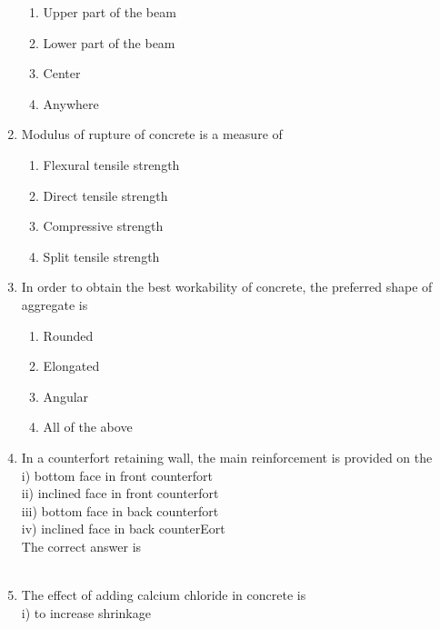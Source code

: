 \documentclass[11pt,a4paper]{article}
\begin{document}
\begin{enumerate}
\begin{enumerate}[label=\Alph*.]
\item{Upper part of the beam}
\item{Lower part of the beam}
\item{Center}
\item{Anywhere}
\end{enumerate}
\item{Modulus of rupture of concrete is a measure of}
\begin{enumerate}[label=\Alph*.]
\item{Flexural tensile strength}
\item{Direct tensile strength}
\item{Compressive strength}
\item{Split tensile strength}
\end{enumerate}
\item{In order to obtain the best workability of concrete, the preferred shape of aggregate is}
\begin{enumerate}[label=\Alph*.]
\item{Rounded}
\item{Elongated}
\item{Angular}
\item{All of the above}
\end{enumerate}
\item{In a counterfort retaining wall, the main reinforcement is provided on the \\
i) bottom face in front counterfort \\
ii) inclined face in front counterfort \\
iii) bottom face in back counterfort \\
iv) inclined face in back counterEort \\
The correct answer is \\
}
\\
\item{The effect of adding calcium chloride in concrete is \\

i) to increase shrinkage \\

}
\end{enumerate}
\end{document}
